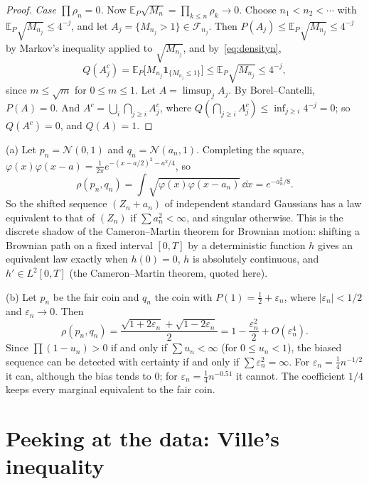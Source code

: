 \begin{proof}
\emph{Case $\prod\rho_n=0$.} Now $\mathbb E_P\sqrt{M_n}=\prod_{k\le n}\rho_k\to0$. Choose $n_1<n_2<\cdots$ with $\mathbb E_P\sqrt{M_{n_j}}\le4^{-j}$, and let $A_j=\{M_{n_j}>1\}\in\mathcal F_{n_j}$. Then
$P(A_j)\le\mathbb E_P\sqrt{M_{n_j}}\le4^{-j}$ by Markov's inequality applied to $\sqrt{M_{n_j}}$, and by~\eqref{eq:densityn},
\[
Q(A_j^c)=\mathbb E_P\bigl[M_{n_j}\mathbf 1_{\{M_{n_j}\le1\}}\bigr]\le\mathbb E_P\sqrt{M_{n_j}}\le4^{-j},
\]
since $m\le\sqrt m$ for $0\le m\le1$. Let $A=\limsup_jA_j$. By Borel--Cantelli, $P(A)=0$. And $A^c=\bigcup_i\bigcap_{j\ge i}A_j^c$, where $Q(\bigcap_{j\ge i}A_j^c)\le\inf_{j\ge i}4^{-j}=0$; so $Q(A^c)=0$, and $Q(A)=1$.
\end{proof}

\begin{example}\label{ex:kakutaniex}
(a) Let $p_n=\mathcal N(0,1)$ and $q_n=\mathcal N(a_n,1)$. Completing the square, $\varphi(x)\varphi(x-a)=\frac1{2\pi}e^{-(x-a/2)^2-a^2/4}$, so
\[
\rho(p_n,q_n)=\int\sqrt{\varphi(x)\varphi(x-a_n)}\,\dd x=e^{-a_n^2/8}.
\]
So the shifted sequence $(Z_n+a_n)$ of independent standard Gaussians has a law equivalent to that of $(Z_n)$ if $\sum a_n^2<\infty$, and singular otherwise. This is the discrete shadow of the Cameron--Martin
theorem for Brownian motion: shifting a Brownian path on a fixed interval $[0,T]$ by a deterministic function $h$ gives an equivalent law exactly when $h(0)=0$, $h$ is absolutely continuous, and $h'\in L^2[0,T]$ (the Cameron--Martin theorem, quoted here).

(b) Let $p_n$ be the fair coin and $q_n$ the coin with $P(1)=\frac12+\varepsilon_n$, where $|\varepsilon_n|<1/2$ and $\varepsilon_n\to0$. Then
\[
\rho(p_n,q_n)=\frac{\sqrt{1+2\varepsilon_n}+\sqrt{1-2\varepsilon_n}}2=1-\frac{\varepsilon_n^2}2+O(\varepsilon_n^4).
\]
Since $\prod(1-u_n)>0$ if and only if $\sum u_n<\infty$ (for $0\le u_n<1$), the biased sequence can be detected with certainty if and only if $\sum\varepsilon_n^2=\infty$. For $\varepsilon_n=\frac14n^{-1/2}$ it can, although the bias tends to $0$; for $\varepsilon_n=\frac14n^{-0.51}$ it cannot. The coefficient $1/4$ keeps every marginal equivalent to the fair coin.
\end{example}

\section{Peeking at the data: Ville's inequality}

